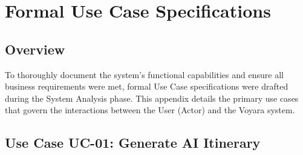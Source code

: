 \chapter{Formal Use Case Specifications}

\section{Overview}
To thoroughly document the system's functional capabilities and ensure all business requirements were met, formal Use Case specifications were drafted during the System Analysis phase. This appendix details the primary use cases that govern the interactions between the User (Actor) and the Voyara system.

\section{Use Case UC-01: Generate AI Itinerary}
